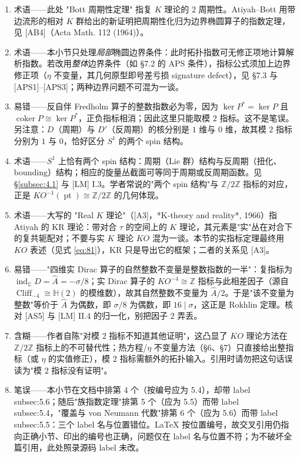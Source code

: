 \documentclass[11pt]{amsart}
\theoremstyle{definition}
\theoremstyle{remark}
\theoremstyle{plain}
\numberwithin{equation}{section}
\renewcommand{\:}{\colon}
\newcommand{\Ahat}{{\hat A}}
\newcommand{\CC}{{\mathbb C}}
\newcommand{\HH}{{\mathbb H}}
\DeclareMathOperator{\pt}{pt}
\newcommand{\ZZ}{{\mathbb Z}}
\newcommand{\cir}{S^1}
\DeclareMathOperator{\coker}{coker}
\DeclareMathOperator{\ind}{ind}
\newcommand{\zmod}[1]{\ZZ/#1\ZZ}
\newcommand{\zt}{\zmod2}
\DeclareMathOperator{\Cliff}{Cliff}
\begin{document}
\begin{enumerate}[leftmargin=2.2em,itemsep=2pt,topsep=2pt]
  \item 术语——此处 "Bott 周期性定理" 指复 $K$ 理论的 $2$ 周期性。Atiyah–Bott 用带边流形的相对 $K$ 群给出的新证明把周期性化归为边界椭圆算子的指数定理，见 [AB4]（Acta Math. 112 (1964)）。
  \item 术语——本小节只处理\emph{局部}椭圆边界条件：此时拓扑指数可无修正项地计算解析指数。若改用\emph{整体}边界条件（如 §7.2 的 APS 条件），指标公式须加上边界修正项（$\eta$ 不变量，其几何原型即号差亏损 signature defect），见 §7.3 与 [APS1]–[APS3]；两种边界问题不可混为一谈。
  \item 易错——反自伴 Fredholm 算子的整数指数必为零，因为 $\ker P^*=\ker P$ 且 $\coker P\cong\ker P^*$，正负指标相消；因此这里只能取模 $2$ 指标。这不是笔误。另注意：$D$（周期）与 $D'$（反周期）的核分别是 $1$ 维与 $0$ 维，故其模 $2$ 指标分别为 $1$ 与 $0$，恰好区分 $S^1$ 的两个 spin 结构。
  \item 术语——$\cir$ 上恰有两个 spin 结构：周期（Lie 群）结构与反周期（扭化、bounding）结构；相应的旋量丛截面可等同于周期或反周期函数。见 \S\ref{subsec:4.1} 与 [LM] I.3。学者常说的"两个 spin 结构"与 $\zt$ 指标的对应，正是 $KO^{-1}(\pt)\cong\zt$ 的几何体现。
  \item 术语——大写的 "Real $K$ 理论"（[A3]，*K-theory and reality*, 1966）指 Atiyah 的 KR 理论：带对合 $\tau$ 的空间上的 $K$ 理论，其元素是"实"丛在对合下的复共轭配对；不要与实 $K$ 理论 $KO$ 混为一谈。本节的实指标定理最终用 $KO$ 表述（见式 \eqref{eq:81}），KR 只是导出它的框架；二者的关系见 [A3]。
  \item 易错——"四维实 Dirac 算子的自然整数不变量是整数指数的一半"：复指标为 $\ind_\CC D=\Ahat=-\sigma/8$；实 Dirac 算子的 $KO^{-4}\cong\ZZ$ 指标与此相差因子（源自 $\Cliff_{-4}\cong\HH(2)$ 的模维数），故其自然整数不变量为 $\Ahat/2$。于是"该不变量为整数"等价于 $\Ahat$ 为偶数，即 $\sigma/8$ 为偶数，即 $16\mid\sigma$，这正是 Rokhlin 定理。核对 [AS5] 与 [LM] II.4 的归一化，别把因子 $2$ 弄丢。
  \item 含糊——作者自陈"对模 $2$ 指标不知道其他证明"，这凸显了 $KO$ 理论方法在 $\zt$ 指标上的不可替代性；热方程/$\eta$ 不变量方法（§6、§7）只直接给出整指标（或 $\eta$ 的实值修正），模 $2$ 指标需额外的拓扑输入。引用时请勿把这句话误读为"模 $2$ 指标没有证明"。
  \item 笔误——本小节在文档中排第 4 个（按编号应为 5.4），却带 label subsec:5.6；随后"族指数定理"排第 5 个（应为 5.5）而带 label subsec:5.4，"覆盖与 von Neumann 代数"排第 6 个（应为 5.6）而带 label subsec:5.5：三个 label 名与位置错位。LaTeX 按位置编号，故交叉引用仍指向正确小节、印出的编号也正确，问题仅在 label 名与位置不符；为不破坏全篇引用，此处照录源码 label 未改。

\end{enumerate}
\end{document}
